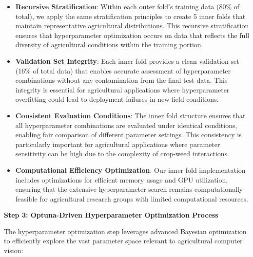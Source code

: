 \begin{itemize}
    \item \textbf{Recursive Stratification}: Within each outer fold's training data (80\% of total), we apply the same stratification principles to create 5 inner folds that maintain representative agricultural distributions. This recursive stratification ensures that hyperparameter optimization occurs on data that reflects the full diversity of agricultural conditions within the training portion.
    
    \item \textbf{Validation Set Integrity}: Each inner fold provides a clean validation set (16\% of total data) that enables accurate assessment of hyperparameter combinations without any contamination from the final test data. This integrity is essential for agricultural applications where hyperparameter overfitting could lead to deployment failures in new field conditions.
    
    \item \textbf{Consistent Evaluation Conditions}: The inner fold structure ensures that all hyperparameter combinations are evaluated under identical conditions, enabling fair comparison of different parameter settings. This consistency is particularly important for agricultural applications where parameter sensitivity can be high due to the complexity of crop-weed interactions.
    
    \item \textbf{Computational Efficiency Optimization}: Our inner fold implementation includes optimizations for efficient memory usage and GPU utilization, ensuring that the extensive hyperparameter search remains computationally feasible for agricultural research groups with limited computational resources.
\end{itemize}

\textbf{Step 3: Optuna-Driven Hyperparameter Optimization Process}

The hyperparameter optimization step leverages advanced Bayesian optimization to efficiently explore the vast parameter space relevant to agricultural computer vision:

